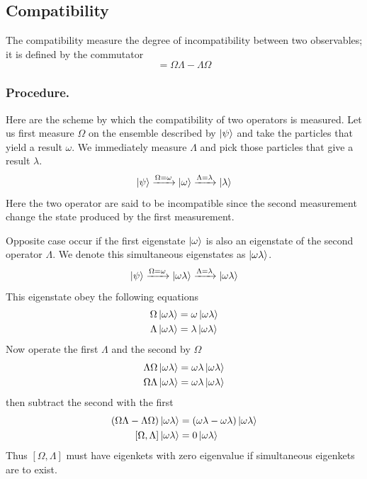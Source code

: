 \documentclass[../../../main.tex]{subfiles}
\begin{document}
\subsection{Compatibility}
The compatibility measure the degree of incompatibility between two observables; it is defined by the commutator
\begin{equation*}
    [\Omega\Lambda]=\Omega\Lambda-\Lambda\Omega
\end{equation*}

\subsubsection{Procedure.}
Here are the scheme by which the compatibility of two operators is measured.
Let us first measure $\Omega$ on the ensemble described by $\ket{\psi}$ and take the particles that yield a result $\omega$.
We immediately measure $\Lambda$ and pick those particles that give a result $\lambda$.
\begin{equation*}
    \ket{\psi}\xrightarrow{\Omega=\omega}\ket{\omega}\xrightarrow{\Lambda=\lambda}\ket{\lambda}
\end{equation*}
Here the two operator are said to be incompatible since the second measurement change the state produced by the first measurement.

Opposite case occur if the first eigenstate $\ket{\omega }$ is also an eigenstate of the second operator $\Lambda$.
We denote this simultaneous eigenstates as $\ket{\omega\lambda}$.
\begin{equation*}
    \ket{\psi}\xrightarrow{\Omega=\omega}\ket{\omega\lambda}\xrightarrow{\Lambda=\lambda}\ket{\omega\lambda}
\end{equation*}
This eigenstate obey the following equations
\begin{align*}
    \Omega \ket{\omega\lambda} & = \omega \ket{\omega\lambda}  \\
    \Lambda\ket{\omega\lambda} & = \lambda \ket{\omega\lambda}
\end{align*}
Now operate the first $\Lambda$ and the second by $\Omega$
\begin{align*}
    \Lambda\Omega \ket{\omega\lambda} & = \omega\lambda \ket{\omega\lambda} \\
    \Omega\Lambda\ket{\omega\lambda}  & = \omega\lambda \ket{\omega\lambda}
\end{align*}
then subtract the second with the first
\begin{align*}
    (\Omega\Lambda-\Lambda\Omega)\ket{\omega\lambda} & = (\omega\lambda-\omega\lambda)\ket{\omega\lambda} \\
    [\Omega,\Lambda]\ket{\omega\lambda}              & = 0 \ket{\omega\lambda}
\end{align*}
Thus $[\Omega,\Lambda]$ must have eigenkets with zero eigenvalue if simultaneous eigenkets are to exist.
\end{document}
